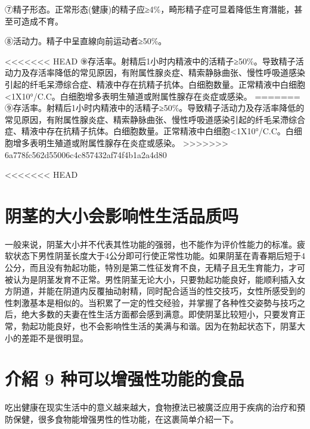 \documentclass[12pt,UTF8]{ctexbook}
\begin{document}
⑦精子形态。正常形态(健康)的精子应≥4\%，畸形精子症可显着降低生育潛能，甚至可造成不育。

⑧活动力。精子中呈直線向前运动者≥50\%。

<<<<<<< HEAD
⑨存活率。射精后1小时内精液中的活精子≥50\%。导致精子活动力及存活率降低的常见原因，有附属性腺炎症、精索静脉曲张、慢性呼吸道感染引起的纤毛呆滯综合症、精液中存在抗精子抗体。白细胞数量。正常精液中白细胞<1X10°/C.C。白细胞增多表明生殖道或附属性腺存在炎症或感染。
=======
⑨存活率。射精后1小时内精液中的活精子≥50\%。导致精子活动力及存活率降低的常见原因，有附属性腺炎症、精索静脉曲张、慢性呼吸道感染引起的纤毛呆滯综合症、精液中存在抗精子抗体。白细胞数量。正常精液中白细胞<1X10°/C.C。白细胞增多表明生殖道或附属性腺存在炎症或感染。
>>>>>>> 6a778fc562d55006c4c857432af74f4b1a2a4d80


<<<<<<< HEAD

\section{阴茎的大小会影响性生活品质吗}

一般来说，阴茎大小并不代表其性功能的强弱，也不能作为评价性能力的标准。疲软状态下男性阴茎长度大于4公分即可行使正常性功能。如果阴茎在青春期后短于4公分，而且没有勃起功能，特別是第二性征发育不良，无精子且无生育能力，才可被认为是阴茎发育不正常。男性阴茎无论大小，只要勃起功能良好，能顺利插入女方阴道，并能在阴道内反覆抽动射精，同时配合适当的性交技巧，女性所感受到的性刺激基本是相似的。当积累了一定的性交经验，并掌握了各种性交姿勢与技巧之后，绝大多数的夫妻在性生活方面都会感到满意。即使阴茎比较短小，只要发育正常，勃起功能良好，也不会影响性生活的美满与和谐。因为在勃起状态下，阴茎大小的差距不是很明显。

\section{介紹 9 种可以增强性功能的食品}

吃出健康在现实生活中的意义越来越大，食物撩法已被廣泛应用于疾病的治疗和預防保健，很多食物能增强男性的性功能，在这裹简单介紹一下。
\end{document}
